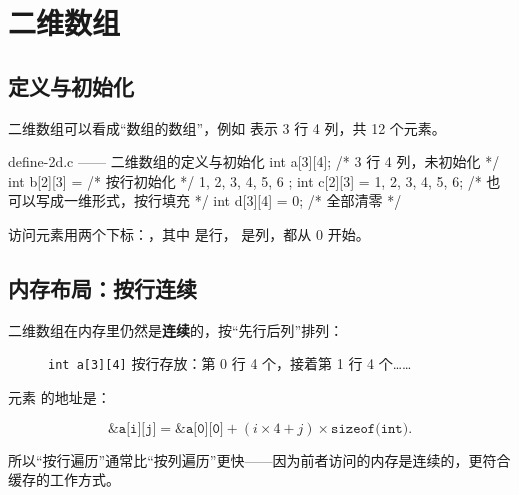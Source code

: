 \section{二维数组}

\subsection{定义与初始化}

二维数组可以看成“数组的数组”，例如  表示 3 行 4 列，共 12 个元素。

\begin{codebox}{define-2d.c —— 二维数组的定义与初始化}
int a[3][4];                    /* 3 行 4 列，未初始化 */
int b[2][3] = {                 /* 按行初始化 */
    {1, 2, 3},
    {4, 5, 6}
};
int c[2][3] = {1, 2, 3, 4, 5, 6};   /* 也可以写成一维形式，按行填充 */
int d[3][4] = {{0}};                /* 全部清零 */
\end{codebox}

访问元素用两个下标：，其中  是行， 是列，都从 0 开始。

\subsection{内存布局：按行连续}

二维数组在内存里仍然是\textbf{连续}的，按“先行后列”排列：

\begin{figure}[htbp]
  \centering
  \caption{\texttt{int a[3][4]} 按行存放：第 0 行 4 个，接着第 1 行 4 个……}
  \label{fig:2d-memory}
\end{figure}

元素  的地址是：

\[
\texttt{\&a[i][j]} = \texttt{\&a[0][0]} + (i \times 4 + j) \times \texttt{sizeof(int)}.
\]

所以“按行遍历”通常比“按列遍历”更快——因为前者访问的内存是连续的，更符合缓存的工作方式。

